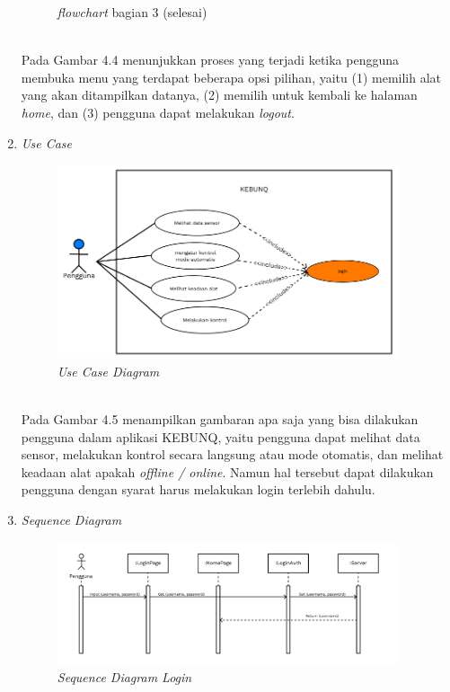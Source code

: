 \begin{flushleft}
\begin{justify}
\begin{enumerate}[label=\alph*.]
\begin{figure}[ht]
                \caption{\textit{flowchart} bagian 3 (selesai)}
            \end{figure}
            \\Pada Gambar 4.4 menunjukkan proses yang terjadi ketika pengguna membuka menu yang terdapat beberapa opsi pilihan, yaitu (1) memilih alat yang akan ditampilkan datanya, (2) memilih untuk kembali ke halaman \emph{home}, dan (3) pengguna dapat melakukan \emph{logout}.
           
            \item \textit{Use Case}
            \begin{figure}[ht]
                \centering
                \includegraphics[width=10cm]{images/bab 4/use-case-user.png}
                \caption{\textit{Use Case Diagram}}
            \end{figure}
            \\Pada Gambar 4.5 menampilkan gambaran apa saja yang bisa dilakukan pengguna dalam aplikasi KEBUNQ, yaitu pengguna dapat melihat data sensor,
            melakukan kontrol secara langsung atau mode otomatis, dan melihat keadaan alat apakah \emph{offline / online}. Namun hal tersebut dapat dilakukan pengguna dengan syarat harus melakukan
            login terlebih dahulu.
            \item \textit{Sequence Diagram}
            \begin{figure}[ht]
                \centering
                \includegraphics[width=10cm]{images/bab 4/Sequence login.png}
                \caption{\textit{Sequence Diagram Login}}
            \end{figure}

\end{enumerate}
\end{justify}
\end{flushleft}
